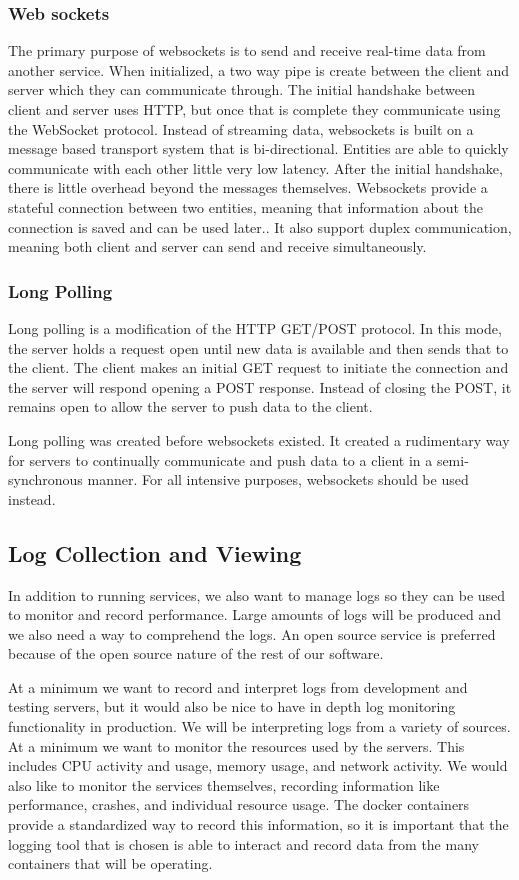 \documentclass[onecolumn, draftclsnofoot,10pt, compsoc]{IEEEtran}
\begin{document}
\subsubsection{Web sockets}
The primary purpose of websockets is to send and receive real-time data from another service.
When initialized, a two way pipe is create between the client and server which they can communicate through.
The initial handshake between client and server uses HTTP, but once that is complete they communicate using the WebSocket protocol.
Instead of streaming data, websockets is built on a message based transport system that is bi-directional.
Entities are able to quickly communicate with each other little very low latency.
After the initial handshake, there is little overhead beyond the messages themselves.
Websockets provide a stateful connection between two entities, meaning that information about the connection is saved and can be used later..
It also support duplex communication, meaning both client and server can send and receive simultaneously.

\subsubsection{Long Polling}
Long polling is a modification of the HTTP GET/POST protocol.
In this mode, the server holds a request open until new data is available and then sends that to the client.
The client makes an initial GET request to initiate the connection and the server will respond opening a POST response.
Instead of closing the POST, it remains open to allow the server to push data to the client.

Long polling was created before websockets existed.
It created a rudimentary way for servers to continually communicate and push data to a client in a semi-synchronous manner.
For all intensive purposes, websockets should be used instead.

\subsection{Log Collection and Viewing}
In addition to running services, we also want to manage logs so they can be used to monitor and record performance.
Large amounts of logs will be produced and we also need a way to comprehend the logs.
An open source service is preferred because of the open source nature of the rest of our software.

At a minimum we want to record and interpret logs from development and testing servers, but it would also be nice to have in depth log monitoring functionality in production.
We will be interpreting logs from a variety of sources.
At a minimum we want to monitor the resources used by the servers.
This includes CPU activity and usage, memory usage, and network activity.
We would also like to monitor the services themselves, recording information like performance, crashes, and individual resource usage.
The docker containers provide a standardized way to record this information, so it is important that the logging tool that is chosen is able to interact and record data from the many containers that will be operating.
\end{document}

